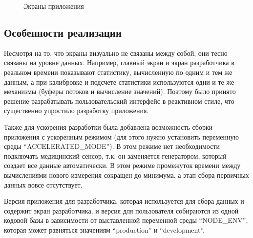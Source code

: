 \documentclass[14pt]{matmex-diploma-custom}
\begin{document}
\begin{figure}[ht]
\begin{center}
{      \label{screenshot:sensors}
    } 
  \end{center}
	\caption{Экраны приложения}
	\label{screenshots}
\end{figure}

\subsection{Особенности реализации}
Несмотря на то, что экраны визуально не связаны между собой, они тесно связаны
на уровне данных. Например, главный экран и экран разработчика в реальном
времени показывают статистику, вычисленную по одним и тем же данным, а при
калибровке и подсчете статистики используются одни и те же механизмы (буферы
потоков и вычисление значений). Поэтому было принято решение разрабатывать
пользовательский интерфейс в реактивном стиле, что существенно упростило
разработку приложения.

Также для ускорения разработки была добавлена возможность сборки приложения с
ускоренным режимом (для этого нужно установить переменную среды
``ACCELERATED\_MODE''). В этом режиме нет необходимости подключать медицинский
сенсор, т.к. он заменяется генератором, который создает все данные
автоматически. В этом режиме промежуток времени между вычислениями нового
измерения сокращен до минимума, а этап сбора первичных данных вовсе отсутствует.

Версия приложения для разработчика, которая используется для сбора данных и
содержит экран разработчика, и версия для пользователя собираются из одной
кодовой базы в зависимости от выставленной переменной среды ``NODE\_ENV'',
которая может равняться значениям ``production'' и ``development''.
\end{document}
